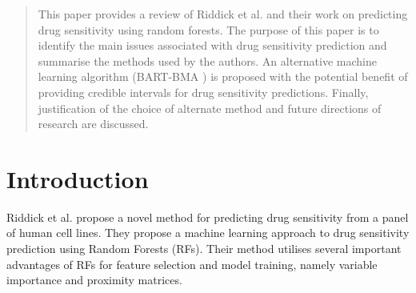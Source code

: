 \documentclass[journal]{IEEEtran}
\begin{document}




\maketitle









%
\IEEEpeerreviewmaketitle

\begin{abstract}
	This paper provides a review of Riddick et al. \cite{riddick2011predicting} and their work on predicting drug sensitivity using random forests. The purpose of this paper is to identify the main issues associated with drug sensitivity prediction and summarise the methods used by the authors. An alternative machine learning algorithm (BART-BMA \cite{hernandez2015bayesian}) is proposed with the potential benefit of providing credible intervals for drug sensitivity predictions. Finally, justification of the choice of alternate method and future directions of research are discussed.
\end{abstract}

\section{Introduction}
Riddick et al. \cite{riddick2011predicting} propose a novel method for predicting drug sensitivity from a panel of human cell lines. They propose a machine learning approach to drug sensitivity prediction using Random Forests (RFs). Their method utilises several important advantages of RFs for feature selection and model training, namely variable importance and proximity matrices. 
\end{document}

